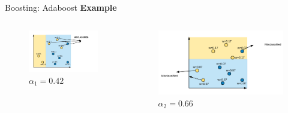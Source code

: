 \documentclass{beamer}
\begin{document}
\begin{frame}{Boosting: Adaboost}
  \textbf{Example}
	\begin{columns}
		\pause 			\begin{column}{0.33\textwidth}
				\centering
				\begin{figure}
					\includegraphics[width = \textwidth]{ada_iter1_misclassify}
									\vspace{-20pt}
					\caption{$\alpha_1=0.42$}
				\end{figure}
				
			\end{column}
			
			
			\pause \begin{column}{0.4\textwidth}
				\centering
				\begin{figure}
					\includegraphics[width = \textwidth]{ada_iter2_misclassify}
					\vspace{-20pt}
					\caption{$\alpha_2=0.66$}
				\end{figure}
	

\end{column}
\end{columns}
\end{frame}
\end{document}

